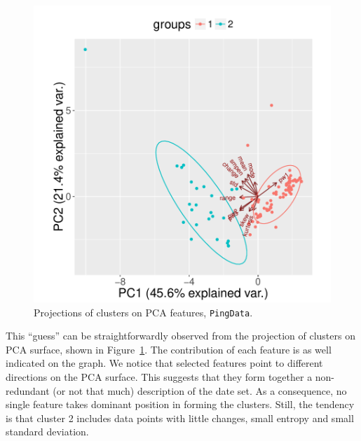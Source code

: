\begin{figure}[!htb]
\centering
\includegraphics[width=.68\textwidth]{gfx/chap3/ping_pca_ping.pdf}
\caption{Projections of clusters on \ac{PCA} features, \texttt{PingData}.}
\label{fig:ping_pca}
\end{figure}

This ``guess'' can be straightforwardly observed from the projection of clusters on \acf{PCA} surface, shown in Figure~\ref{fig:ping_pca}.
The contribution of each feature is as well indicated on the graph.
We notice that selected features point to different directions on the \ac{PCA} surface.
This suggests that they form together a non-redundant (or not that much) description of the date set.
As a consequence, no single feature takes dominant position in forming the clusters.
Still, the tendency is that cluster 2 includes data points with little changes, small entropy and small standard deviation. 

